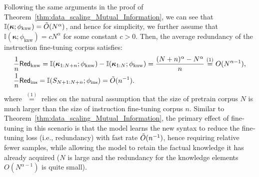 \documentclass[11pt]{article}
\theoremstyle{plain}
\theoremstyle{definition}
\newcommand{\redundency}{\mathsf{Red}}
\newcommand{\knwModel}{\phi_{\text{knw}}}
\newcommand{\synModel}{\phi_{\text{syn}}}
\newcommand{\instructionModel}{\phi_{\text{ins}}}
\newcommand{\Knwelem}{\boldsymbol{\kappa}}
\begin{document}



Following the same arguments in the proof of Theorem~\ref{thm:data_scaling_Mutual_Information}, we can see that
\( \mathbb{I}(\Knwelem; \knwModel) = \Tilde{O}(N^{\alpha}) \),
and hence for simplicity, we further assume that \( \mathbb{I}(\Knwelem; \knwModel) = cN^{\alpha} \) for some constant \( c > 0 \).
Then,
the average redundancy of the instruction fine-tuning corpus satisfies:
\begin{align*}
  &  \dfrac{1}{n}\redundency_{\text{knw}}=\mathbb{I}(\Knwelem_{1:N+n}; \knwModel)-\mathbb{I}(\Knwelem_{1:N}; \knwModel) = \dfrac{(N+n)^{\alpha}-N^{\alpha}}{n}\overset{(1)}{=}O(N^{\alpha-1}),
 \\   
 & \dfrac{1}{n}\redundency_{\text{ins}}=\mathbb{I}(S_{N+1:N+n}; \instructionModel)= \Tilde{O}(n^{-1}).
\end{align*}
where $\overset{(1)}{=}$ relies on the natural assumption that the size of pretrain corpus $N$ is much larger than the size of instruction fine-tuning corpus $n$.
Similar to Theorem~\ref{thm:data_scaling_Mutual_Information}, the primary effect of fine‐tuning in this scenario is that the model learns the new syntax to reduce the fine‐tuning loss (i.e., redundancy) with fast rate $\Tilde{O}(n^{-1})$, hence requiring relative fewer samples, while allowing the model to retain the factual knowledge it has already acquired
($N$ is large and the redundancy for the knowledge elements
$O(N^{\alpha-1})$ is quite small).
\end{document}
